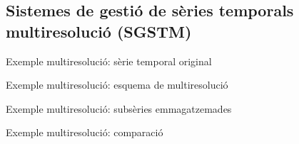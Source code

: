 \subsection[SGSTM]{Sistemes de gestió de sèries temporals multiresolució (SGSTM)}




\begin{frame}{Exemple multiresolució: sèrie temporal original}

\begin{center}

\end{center}

\end{frame}

\begin{frame}{Exemple multiresolució: esquema de multiresolució}


\begin{center}

\end{center}

\end{frame}

\begin{frame}{Exemple multiresolució: subsèries emmagatzemades}


\begin{center}

\end{center}

\end{frame}

\begin{frame}{Exemple multiresolució: comparació}

\begin{center}

\end{center}

\end{frame}




